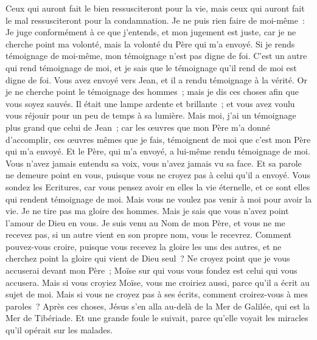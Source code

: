 \begin{multicols}{2}
 Ceux qui auront fait le bien ressusciteront pour la vie, mais ceux qui auront fait le mal ressusciteront pour la condamnation.
Je ne puis rien faire de moi-même~: Je juge conformément à ce que j'entends, et mon jugement est juste, car je ne cherche point ma volonté, mais la volonté du Père qui m'a envoyé.
Si je rends témoignage de moi-même, mon témoignage n'est pas digne de foi.
C'est un autre qui rend témoignage de moi, et je sais que le témoignage qu'il rend de moi est digne de foi.
Vous avez envoyé vers Jean, et il a rendu témoignage à la vérité.
Or je ne cherche point le témoignage des hommes~; mais je dis ces choses afin que vous soyez sauvés.
Il était une lampe ardente et brillante~; et vous avez voulu vous réjouir pour un peu de temps à sa lumière.
Mais moi, j'ai un témoignage plus grand que celui de Jean~; car les œuvres que mon Père m'a donné d'accomplir, ces œuvres mêmes que je fais, témoignent de moi que c'est mon Père qui m'a envoyé.
Et le Père, qui m'a envoyé, a lui-même rendu témoignage de moi. Vous n'avez jamais entendu sa voix, vous n'avez jamais vu sa face.
Et sa parole ne demeure point en vous, puisque vous ne croyez pas à celui qu'il a envoyé.
Vous sondez les Ecritures, car vous pensez avoir en elles la vie éternelle, et ce sont elles qui rendent témoignage de moi.
Mais vous ne voulez pas venir à moi pour avoir la vie.
Je ne tire pas ma gloire des hommes.
Mais je sais que vous n'avez point l'amour de Dieu en vous.
Je suis venu au Nom de mon Père, et vous ne me recevez pas, si un autre vient en son propre nom, vous le recevrez.
Comment pouvez-vous croire, puisque vous recevez la gloire les uns des autres, et ne cherchez point la gloire qui vient de Dieu seul~?
Ne croyez point que je vous accuserai devant mon Père~; Moïse sur qui vous vous fondez est celui qui vous accusera.
Mais si vous croyiez Moïse, vous me croiriez aussi, parce qu'il a écrit au sujet de moi.
Mais si vous ne croyez pas à ses écrits, comment croirez-vous à mes paroles~?
\VerseOne{}Après ces choses, Jésus s'en alla au-delà de la Mer de Galilée, qui est la Mer de Tibériade.
Et une grande foule le suivait, parce qu'elle voyait les miracles qu'il opérait sur les malades.

\end{multicols}
